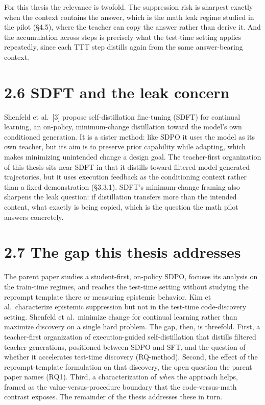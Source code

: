 For this thesis the relevance is twofold. The suppression risk is sharpest exactly when the context contains the answer, which is the math leak regime studied in the pilot (§4.5), where the teacher can copy the answer rather than derive it. And the accumulation across steps is precisely what the test-time setting applies repeatedly, since each TTT step distills again from the same answer-bearing context.

\section{2.6 SDFT and the leak concern}\label{sdft-and-the-leak-concern}

Shenfeld et al.~{[}3{]} propose self-distillation fine-tuning (SDFT) for continual learning, an on-policy, minimum-change distillation toward the model's own conditioned generation. It is a sister method: like SDPO it uses the model as its own teacher, but its aim is to preserve prior capability while adapting, which makes minimizing unintended change a design goal. The teacher-first organization of this thesis sits near SDFT in that it distills toward filtered model-generated trajectories, but it uses execution feedback as the conditioning context rather than a fixed demonstration (§3.3.1). SDFT's minimum-change framing also sharpens the leak question: if distillation transfers more than the intended content, what exactly is being copied, which is the question the math pilot answers concretely.

\section{2.7 The gap this thesis addresses}\label{the-gap-this-thesis-addresses}

The parent paper studies a student-first, on-policy SDPO, focuses its analysis on the train-time regimes, and reaches the test-time setting without studying the reprompt template there or measuring epistemic behavior. Kim et al.~characterize epistemic suppression but not in the test-time code-discovery setting. Shenfeld et al.~minimize change for continual learning rather than maximize discovery on a single hard problem. The gap, then, is threefold. First, a teacher-first organization of execution-guided self-distillation that distills filtered teacher generations, positioned between SDPO and SFT, and the question of whether it accelerates test-time discovery (RQ-method). Second, the effect of the reprompt-template formulation on that discovery, the open question the parent paper names (RQ1). Third, a characterization of \emph{when} the approach helps, framed as the value-versus-procedure boundary that the code-versus-math contrast exposes. The remainder of the thesis addresses these in turn.

